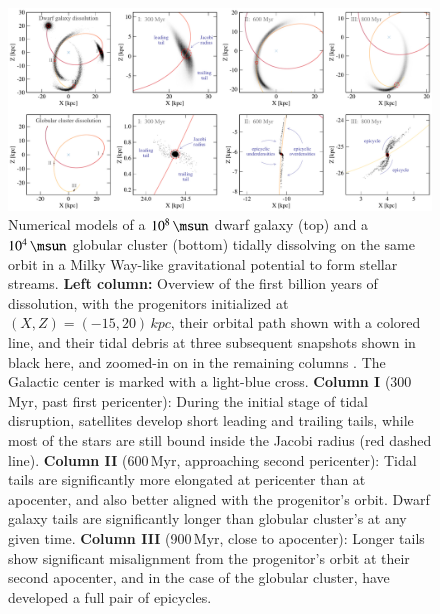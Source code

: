 \documentclass[final,5p,times,twocolumn,authoryear]{elsarticle}
\begin{document}
\begin{figure}[t!]
\begin{center}
\includegraphics[width=1\textwidth]{figures/stream_formation.pdf}
\end{center}
\caption{%
Numerical models of a $10^8\,\unit{\msun}$ dwarf galaxy (top) and a $10^4\,\unit{\msun}$ globular cluster (bottom) tidally dissolving on the same orbit in a Milky Way-like gravitational potential to form stellar streams.
\textbf{Left column:} Overview of the first billion years of dissolution, with the progenitors initialized at $(X,Z)=(-15,20)\,\unit{kpc}$, their orbital path shown with a colored line, and their tidal debris at three subsequent snapshots shown in black here, and zoomed-in on in the remaining columns .
The Galactic center is marked with a light-blue cross.
\textbf{Column I} (300\,\unit{Myr}, past first pericenter): During the initial stage of tidal disruption, satellites develop short leading and trailing tails, while most of the stars are still bound inside the Jacobi radius (red dashed line).
\textbf{Column II} (600\,\unit{Myr}, approaching second pericenter): Tidal tails are significantly more elongated at pericenter than at apocenter, and also better aligned with the progenitor's orbit.
Dwarf galaxy tails are significantly longer than globular cluster's at any given time.
\textbf{Column III} (900\,\unit{Myr}, close to apocenter): Longer tails show significant misalignment from the progenitor's orbit at their second apocenter, and in the case of the globular cluster, have developed a full pair of epicycles.
}
\label{fig:stream_formation}
\end{figure}
\end{document}
